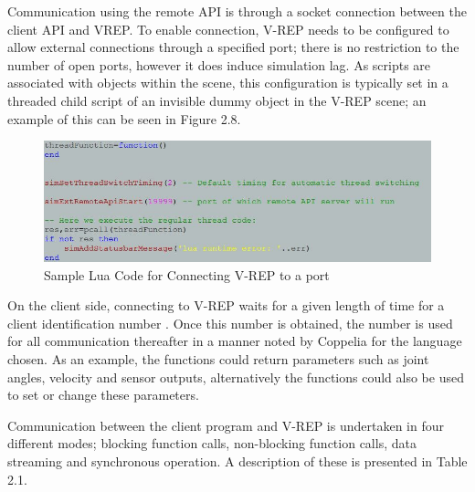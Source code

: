 \documentclass[12pt,openany,a4paper]{book}
\begin{document}
Communication using the remote API is through a socket connection between the client API and VREP. To enable connection, V-REP needs to be configured to allow external connections through a specified port; there is no restriction to the number of open ports, however it does induce simulation lag. As scripts are associated with objects within the scene, this configuration is typically set in a threaded child script of an invisible dummy object in the V-REP scene; an example of this can be seen in Figure 2.8. 

\begin{center}
\begin{figure}[htb]
  \includegraphics[width=\linewidth]{vrep_port_listen.jpg}
\caption{Sample Lua Code for Connecting V-REP to a port}
\end{figure}
\end{center}
On the client side, connecting to V-REP waits for a given length of time for a client identification number \cite{functionsVREP}. Once this number is obtained, the number is used for all communication thereafter in a manner noted by Coppelia for the language chosen. As an example, the functions could return parameters such as joint angles, velocity and sensor outputs, alternatively the functions could also be used to set or change these parameters.

Communication between the client program and V-REP is undertaken in four different modes; blocking function calls, non-blocking function calls, data streaming and synchronous operation. A description of these is presented in Table 2.1.
\end{document}
